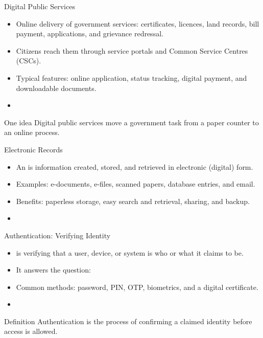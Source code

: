 \documentclass[aspectratio=169]{beamer}
\begin{document}
\begin{frame}{Digital Public Services}
  \begin{itemize}
    \item Online delivery of government services: certificates, licences,
      land records, bill payment, applications, and grievance redressal.
    \item Citizens reach them through service portals and Common Service
      Centres (CSCs).
    \item Typical features: online application, status tracking, digital
      payment, and downloadable documents.
    \item {}
  \end{itemize}
  \begin{block}{One idea}
    Digital public services move a government task from a paper counter to an
    online process.
  \end{block}
\end{frame}

\begin{frame}{Electronic Records}
  \begin{itemize}
    \item An  is information created, stored, and
      retrieved in electronic (digital) form.
    \item Examples: e-documents, e-files, scanned papers, database entries,
      and email.
    \item Benefits: paperless storage, easy search and retrieval, sharing,
      and backup.
    \item {}
  \end{itemize}
\end{frame}

\begin{frame}{Authentication: Verifying Identity}
  \begin{itemize}
    \item {} is verifying that a user, device, or system is
      who or what it claims to be.
    \item It answers the question: 
    \item Common methods: password, PIN, OTP, biometrics, and a digital
      certificate.
    \item {}
  \end{itemize}
  \begin{block}{Definition}
    Authentication is the process of confirming a claimed identity before
    access is allowed.
  \end{block}
\end{frame}
\end{document}
